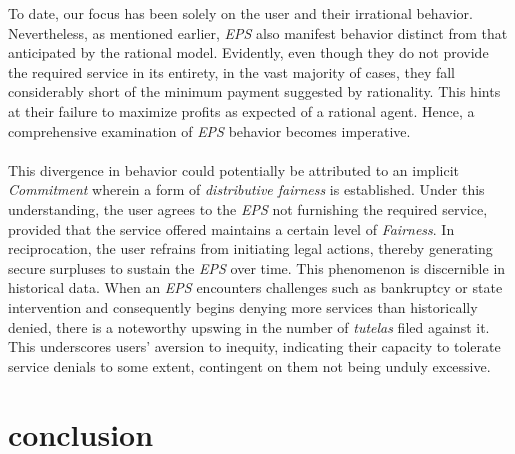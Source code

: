 \documentclass[12pt]{article}
\begin{document}
\begin{flushleft}
    To date, our focus has been solely on the user and their irrational behavior. Nevertheless, as mentioned earlier, \textit{EPS} also manifest behavior distinct from that anticipated by the rational model. Evidently, even though they do not provide the required service in its entirety, in the vast majority of cases, they fall considerably short of the minimum payment suggested by rationality. This hints at their failure to maximize profits as expected of a rational agent. Hence, a comprehensive examination of \textit{EPS} behavior becomes imperative.\\~\\

This divergence in behavior could potentially be attributed to an implicit \textit{Commitment} wherein a form of \textit{distributive fairness} is established. Under this understanding, the user agrees to the \textit{EPS} not furnishing the required service, provided that the service offered maintains a certain level of \textit{Fairness}. In reciprocation, the user refrains from initiating legal actions, thereby generating secure surpluses to sustain the \textit{EPS} over time. This phenomenon is discernible in historical data. When an \textit{EPS} encounters challenges such as bankruptcy or state intervention and consequently begins denying more services than historically denied, there is a noteworthy upswing in the number of \textit{tutelas} filed against it. This underscores users' aversion to inequity, indicating their capacity to tolerate service denials to some extent, contingent on them not being unduly excessive.

\end{flushleft}

\section{conclusion}
\newpage

\medskip

\nocite{*}
\printbibliography
\end{document}
